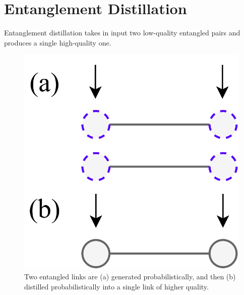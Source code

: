 \documentclass{masterthesis}
\begin{document}





\section{Entanglement Distillation}

Entanglement distillation takes in input two low-quality entangled pairs and produces a single high-quality one.

\begin{figure}[ht]
    \centering
    \includegraphics[width=0.33\linewidth]{images/dist.png}
    \caption{Two entangled links are (a) generated probabilistically, and then (b) distilled probabilistically into a single link of higher quality.}\label{fig:entanglement_distillation}
\end{figure}
\end{document}
